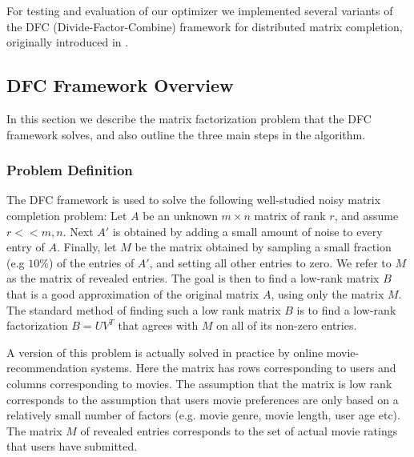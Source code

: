 For testing and evaluation of our optimizer we implemented several variants of the DFC (Divide-Factor-Combine) framework for distributed matrix completion, originally introduced in \cite{MTJ13}.

\subsection{DFC Framework Overview}
In this section we describe the matrix factorization problem that the DFC framework solves, and also outline the three main steps in the algorithm. 
\subsubsection{Problem Definition}
The DFC framework is used to solve the following well-studied noisy matrix completion problem: Let $A$ be an unknown $m\times n$ matrix of rank $r$, and assume $r<<m,n$. Next $A'$ is obtained by adding a small amount of noise to every entry of $A$. Finally, let $M$ be the matrix obtained by sampling a small fraction (e.g $10\%$) of the entries of $A'$, and setting all other entries to zero. We refer to $M$ as the matrix of revealed entries. The goal is then to find a low-rank matrix $B$ that is a good approximation of the original matrix $A$, using only the matrix $M$. The standard method of finding such a low rank matrix $B$ is to find a low-rank factorization $B=UV^T$ that agrees with $M$ on all of its non-zero entries.

A version of this problem is actually solved in practice by online movie-recommendation systems. Here the matrix has rows corresponding to users and columns corresponding to movies. The assumption that the matrix is low rank corresponds to the assumption that users movie preferences are only based on a relatively small number of factors (e.g. movie genre, movie length, user age etc). The matrix $M$ of revealed entries corresponds to the set of actual movie ratings that users have submitted.

